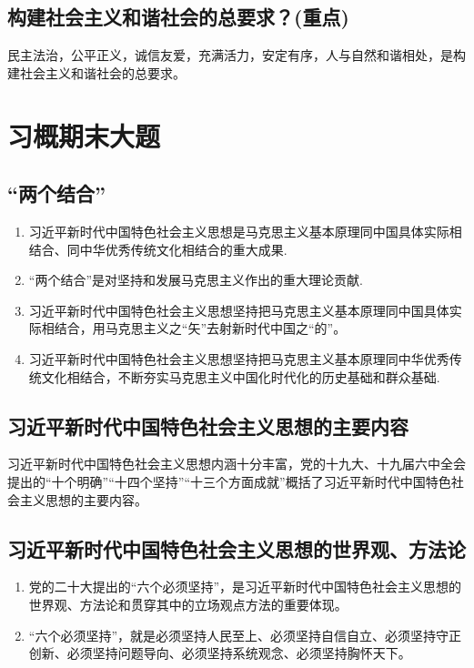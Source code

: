 \documentclass[12pt, a4paper, oneside]{ctexbook}
\begin{document}
\section{构建社会主义和谐社会的总要求？(重点)}

民主法治，公平正义，诚信友爱，充满活力，安定有序，人与自然和谐相处，是构建社会主义和谐社会的总要求。


\chapter{习概期末大题}

\section{“两个结合”}

\begin{enumerate}
\item 习近平新时代中国特色社会主义思想是马克思主义基本原理同中国具体实际相结合、同中华优秀传统文化相结合的重大成果.

\item “两个结合”是对坚持和发展马克思主义作出的重大理论贡献.

\item 习近平新时代中国特色社会主义思想坚持把马克思主义基本原理同中国具体实际相结合，用马克思主义之“矢”去射新时代中国之“的”。

\item 习近平新时代中国特色社会主义思想坚持把马克思主义基本原理同中华优秀传统文化相结合，不断夯实马克思主义中国化时代化的历史基础和群众基础.
\end{enumerate}

\section{习近平新时代中国特色社会主义思想的主要内容}

习近平新时代中国特色社会主义思想内涵十分丰富，党的十九大、十九届六中全会提出的“十个明确”“十四个坚持”“十三个方面成就”概括了习近平新时代中国特色社会主义思想的主要内容。

\section{习近平新时代中国特色社会主义思想的世界观、方法论}

\begin{enumerate}
\item 党的二十大提出的“六个必须坚持”，是习近平新时代中国特色社会主义思想的世界观、方法论和贯穿其中的立场观点方法的重要体现。

\item “六个必须坚持”，就是必须坚持人民至上、必须坚持自信自立、必须坚持守正创新、必须坚持问题导向、必须坚持系统观念、必须坚持胸怀天下。
\end{enumerate}
\end{document}
